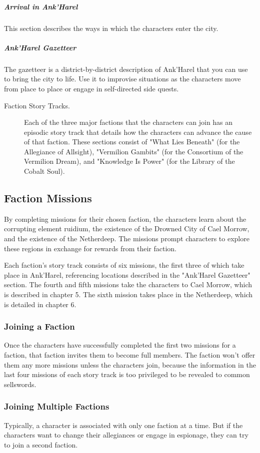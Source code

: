 \documentclass[10pt,a4paper,twoside,fancy,bg=print,twocolumn,openany,nodeprecatedcode]{dndbook}
\begin{document}
\subparagraph{Arrival in Ank'Harel}
This section describes the ways in which the characters enter the city.

\subparagraph{Ank'Harel Gazetteer}
The gazetteer is a district-by-district description of Ank'Harel that you can use to bring the city to life. Use it to improvise situations as the characters move from place to place or engage in self-directed side quests.


\begin{description}
\item[Faction Story Tracks.]
Each of the three major factions that the characters can join has an episodic story track that details how the characters can advance the cause of that faction. These sections consist of "What Lies Beneath" (for the Allegiance of Allsight), "Vermilion Gambits" (for the Consortium of the Vermilion Dream), and "Knowledge Is Power" (for the Library of the Cobalt Soul).
\end{description}

\subsection{Faction Missions}
By completing missions for their chosen faction, the characters learn about the corrupting element ruidium, the existence of the Drowned City of Cael Morrow, and the existence of the Netherdeep. The missions prompt characters to explore these regions in exchange for rewards from their faction.

Each faction's story track consists of six missions, the first three of which take place in Ank'Harel, referencing locations described in the "Ank'Harel Gazetteer" section. The fourth and fifth missions take the characters to Cael Morrow, which is described in chapter 5. The sixth mission takes place in the Netherdeep, which is detailed in chapter 6.

\subsubsection{Joining a Faction}
Once the characters have successfully completed the first two missions for a faction, that faction invites them to become full members. The faction won't offer them any more missions unless the characters join, because the information in the last four missions of each story track is too privileged to be revealed to common sellswords.

\subsubsection{Joining Multiple Factions}
Typically, a character is associated with only one faction at a time. But if the characters want to change their allegiances or engage in espionage, they can try to join a second faction.
\end{document}
